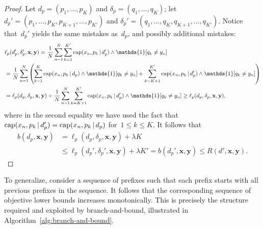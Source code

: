 \documentclass[twoside,11pt]{article}
\def\one{\mathds{1}}
\newcommand{\x}{\mathbf{x}}
\newcommand{\y}{\mathbf{y}}
\def\RL{{d}}
\def\Prefix{d_p}
\def\Labels{\delta_p}
\def\Obj{R}
\def\Loss{\ell}
\def\Reg{{\lambda}}
\def\Cap{\textnormal{cap}}
\def\one{\mathds{1}}
\newcommand{\nn}{\nonumber}
\newcommand{\given}{\,|\,}
\begin{document}
\begin{arxiv}
\begin{proof}
Let ${\Prefix = (p_1, \dots, p_K)}$ and ${\Labels = (q_1, \dots, q_K)}$;
let ${\Prefix' = (p_1, \dots, p_K, p_{K+1}, \dots, p_{K'})}$
and ${\Labels' = (q_1, \dots, q_K, q_{K+1}, \dots, q_{K'})}$.
%
Notice that~$\Prefix'$ yields the same mistakes as~$\Prefix$,
and possibly additional mistakes:
\begin{align}
&\Loss_p(\Prefix', \Labels', \x, \y)
= \frac{1}{N} \sum_{n=1}^N  \sum_{k=1}^{K'} \Cap(x_n, p_k \given \Prefix') \wedge \one [ q_k \neq y_n ] \nn \\
&= \frac{1}{N} \sum_{n=1}^N \left( \sum_{k=1}^K \Cap(x_n, p_k \given \Prefix) \wedge \one [ q_k \neq y_n ]
+ \sum_{k=K+1}^{K'} \Cap(x_n, p_k \given \Prefix') \wedge \one [ q_k \neq y_n ] \right) \nn \\
&=\Loss_p(\Prefix, \Labels, \x, \y)
+ \frac{1}{N} \sum_{n=1}^N \sum_{k=K+1}^{K'} \Cap(x_n, p_k \given \Prefix') \wedge \one [ q_k \neq y_n ]
\ge \Loss_p(\Prefix, \Labels, \x, \y),
\label{eq:prefix-loss}
\end{align}
where in the second equality we have used the fact that
${\Cap(x_n, p_k \given \Prefix') = \Cap(x_n, p_k \given \Prefix)}$
for~${1 \le k \le K}$.
%
It follows that
\begin{align}
b(\Prefix, \x, \y) &= \Loss_p(\Prefix, \Labels, \x, \y) + \Reg K \nn \\
&\le  \Loss_p(\Prefix', \Labels', \x, \y) + \Reg K' = b(\Prefix', \x, \y)
\le \Obj(\RL', \x, \y).
\label{eq:prefix-lb}
\end{align}
\end{proof}
\end{arxiv}

To generalize, consider a sequence of prefixes such that each prefix
starts with all previous prefixes in the sequence.
%
It follows that the corresponding sequence of objective lower bounds
increases monotonically.
%
This is precisely the structure required and exploited by branch-and-bound,
illustrated in Algorithm~\ref{alg:branch-and-bound}.
\end{document}
